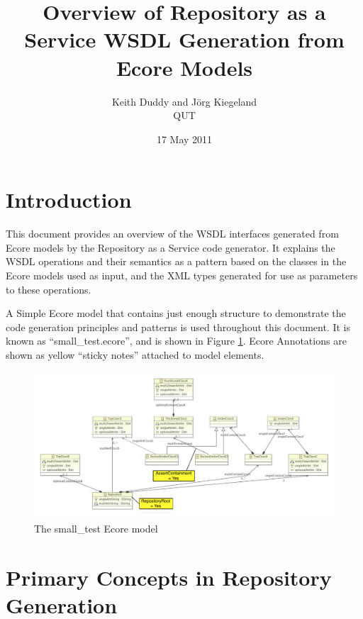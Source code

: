 \documentclass[11pt]{article}
\title{Overview of Repository as a Service WSDL Generation from Ecore Models}
\author{Keith Duddy and J\"org Kiegeland\\QUT}
\date{17 May 2011}                                           %
\begin{document}
\maketitle
\section{Introduction}
This document provides an overview of the WSDL interfaces generated from Ecore models by the Repository as a Service code generator. It explains the WSDL operations and their semantics as a pattern based on the classes in the Ecore models used as input, and the XML types generated for use as parameters to these operations.

A Simple Ecore model that contains just enough structure to demonstrate the code generation principles and patterns is used throughout this document. It is known as ``small\_test.ecore'', and is shown in Figure \ref{small-test}. Ecore Annotations are shown as yellow ``sticky notes'' attached to model elements.

\begin{figure}[htbp]
\begin{center}
\includegraphics[width=15cm]{SmallTestEcoreWithAnnotations.pdf}
\caption{The small\_test Ecore model}
\label{small-test}
\end{center}
\end{figure}

\section{Primary Concepts in Repository Generation} \label{primary-concepts}
\end{document}
